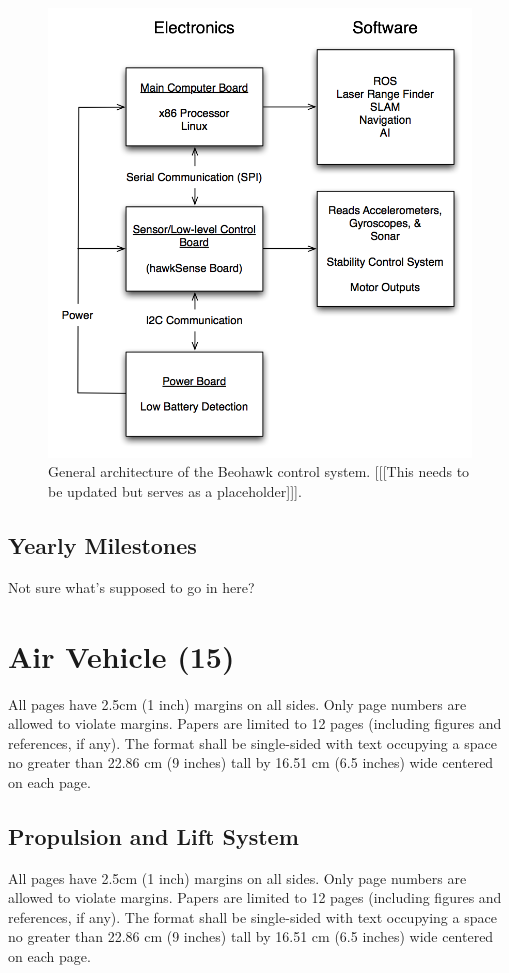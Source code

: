 \documentclass[12pt, letterpaper]{article}
\begin{document}
\begin{figure}[h]
\centering
\includegraphics[width=12cm]{Architecture-Diagram.png}
\caption{General architecture of the Beohawk control system. [[[This needs to be updated but serves as a placeholder]]].} 
\label{fig:architecture}
\end{figure}

\subsection{Yearly Milestones}
Not sure what's supposed to go in here?


\section{Air Vehicle (15)}
All pages have 2.5cm (1 inch) margins on all sides. Only page numbers are allowed to violate margins. Papers are limited to 12 pages (including figures and references, if any). The format shall be single-sided with text occupying a space no greater than 22.86 cm (9 inches) tall by 16.51 cm (6.5 inches) wide centered on each page.

\subsection{Propulsion and Lift System}
All pages have 2.5cm (1 inch) margins on all sides. Only page numbers are allowed to violate margins. Papers are limited to 12 pages (including figures and references, if any). The format shall be single-sided with text occupying a space no greater than 22.86 cm (9 inches) tall by 16.51 cm (6.5 inches) wide centered on each page.
\end{document}
